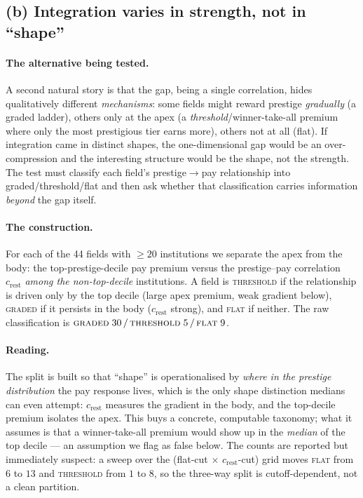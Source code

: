 \documentclass[11pt]{article}
\begin{document}
\subsection{(b) Integration varies in strength, not in ``shape''}

\paragraph{The alternative being tested.} A second natural story is that the gap, being a single correlation, hides qualitatively different \emph{mechanisms}: some fields might reward prestige \emph{gradually} (a graded ladder), others only at the apex (a \emph{threshold}/winner-take-all premium where only the most prestigious tier earns more), others not at all (flat). If integration came in distinct shapes, the one-dimensional gap would be an over-compression and the interesting structure would be the shape, not the strength. The test must classify each field's prestige$\to$pay relationship into graded/threshold/flat and then ask whether that classification carries information \emph{beyond} the gap itself.

\paragraph{The construction.} For each of the 44 fields with $\ge 20$ institutions we separate the apex from the body: the top-prestige-decile pay premium versus the prestige--pay correlation $c_{\mathrm{rest}}$ \emph{among the non-top-decile} institutions. A field is \textsc{threshold} if the relationship is driven only by the top decile (large apex premium, weak gradient below), \textsc{graded} if it persists in the body ($c_{\mathrm{rest}}$ strong), and \textsc{flat} if neither. The raw classification is $\textsc{graded}\;30 \,/\, \textsc{threshold}\;5 \,/\, \textsc{flat}\;9$.

\paragraph{Reading.} The split is built so that ``shape'' is operationalised by \emph{where in the prestige distribution} the pay response lives, which is the only shape distinction medians can even attempt: $c_{\mathrm{rest}}$ measures the gradient in the body, and the top-decile premium isolates the apex. This buys a concrete, computable taxonomy; what it assumes is that a winner-take-all premium would show up in the \emph{median} of the top decile --- an assumption we flag as false below. The counts are reported but immediately suspect: a sweep over the (flat-cut $\times$ $c_{\mathrm{rest}}$-cut) grid moves \textsc{flat} from $6$ to $13$ and \textsc{threshold} from $1$ to $8$, so the three-way split is cutoff-dependent, not a clean partition.
\end{document}
